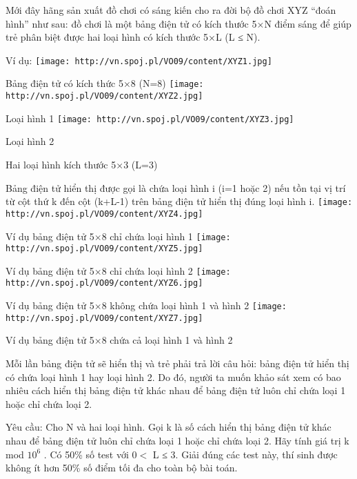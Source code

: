 Mới đây hãng sản xuất đồ chơi có sáng kiến cho ra đời bộ đồ chơi XYZ “đoán hình” như sau: đồ chơi là một bảng điện tử có kích thước 5×N điểm sáng để giúp trẻ phân biệt được hai loại hình có kích thước 5×L (L ≤ N).  

   Ví dụ:  
\texttt{[image: http://vn.spoj.pl/VO09/content/XYZ1.jpg]}

               Bảng điện tử có kích thức 5×8 (N=8)             
\texttt{[image: http://vn.spoj.pl/VO09/content/XYZ2.jpg]}

                       Loại hình 1                     
\texttt{[image: http://vn.spoj.pl/VO09/content/XYZ3.jpg]}

                       Loại hình 2                     

                       Hai loại hình kích thước 5×3 (L=3)                     

   Bảng điện tử hiển thị được gọi là chứa loại hình i (i=1 hoặc 2) nếu tồn tại vị trí từ cột thứ k đến cột (k+L-1) trên bảng điện tử hiển thị đúng loại hình i.  
\texttt{[image: http://vn.spoj.pl/VO09/content/XYZ4.jpg]}

               Ví dụ bảng điện tử 5×8 chỉ chứa loại hình 1             
\texttt{[image: http://vn.spoj.pl/VO09/content/XYZ5.jpg]}

               Ví dụ bảng điện tử 5×8 chỉ chứa loại hình 2             
\texttt{[image: http://vn.spoj.pl/VO09/content/XYZ6.jpg]}

               Ví dụ bảng điện tử 5×8  không chứa loại hình 1 và hình 2             
\texttt{[image: http://vn.spoj.pl/VO09/content/XYZ7.jpg]}

               Ví dụ bảng điện tử 5×8  chứa cả loại hình 1 và hình 2             

   Mỗi lần bảng điện tử sẽ hiển thị và trẻ phải trả lời câu hỏi: bảng điện tử hiển thị có chứa loại hình 1 hay loại hình 2. Do đó, người ta muốn khảo sát xem có bao nhiêu cách hiển thị bảng điện tử khác nhau để bảng điện tử luôn chỉ chứa loại 1 hoặc chỉ chứa loại 2.  

   Yêu cầu: Cho N và hai loại hình. Gọi k là số cách hiển thị bảng điện tử khác nhau để bảng điện tử luôn chỉ chứa loại 1 hoặc chỉ chứa loại 2. Hãy tính giá trị k  mod $10^{6}$   .
Có 50\% số test với 0$<$ L ≤ 3. Giải đúng các test này, thí sinh được không ít hơn 50\% số điểm tối đa cho toàn bộ bài toán.